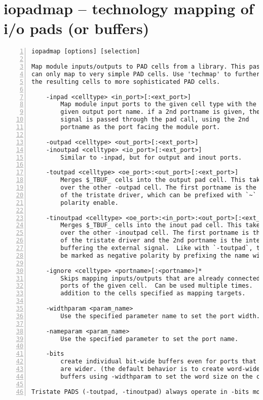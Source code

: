 \section{iopadmap -- technology mapping of i/o pads (or buffers)}
\label{cmd:iopadmap}
\begin{lstlisting}[numbers=left,frame=single]
    iopadmap [options] [selection]

Map module inputs/outputs to PAD cells from a library. This pass
can only map to very simple PAD cells. Use 'techmap' to further map
the resulting cells to more sophisticated PAD cells.

    -inpad <celltype> <in_port>[:<ext_port>]
        Map module input ports to the given cell type with the
        given output port name. if a 2nd portname is given, the
        signal is passed through the pad call, using the 2nd
        portname as the port facing the module port.

    -outpad <celltype> <out_port>[:<ext_port>]
    -inoutpad <celltype> <io_port>[:<ext_port>]
        Similar to -inpad, but for output and inout ports.

    -toutpad <celltype> <oe_port>:<out_port>[:<ext_port>]
        Merges $_TBUF_ cells into the output pad cell. This takes precedence
        over the other -outpad cell. The first portname is the enable input
        of the tristate driver, which can be prefixed with `~` for negative
        polarity enable.

    -tinoutpad <celltype> <oe_port>:<in_port>:<out_port>[:<ext_port>]
        Merges $_TBUF_ cells into the inout pad cell. This takes precedence
        over the other -inoutpad cell. The first portname is the enable input
        of the tristate driver and the 2nd portname is the internal output
        buffering the external signal.  Like with `-toutpad`, the enable can
        be marked as negative polarity by prefixing the name with `~`.

    -ignore <celltype> <portname>[:<portname>]*
        Skips mapping inputs/outputs that are already connected to given
        ports of the given cell.  Can be used multiple times.  This is in
        addition to the cells specified as mapping targets.

    -widthparam <param_name>
        Use the specified parameter name to set the port width.

    -nameparam <param_name>
        Use the specified parameter to set the port name.

    -bits
        create individual bit-wide buffers even for ports that
        are wider. (the default behavior is to create word-wide
        buffers using -widthparam to set the word size on the cell.)

Tristate PADS (-toutpad, -tinoutpad) always operate in -bits mode.
\end{lstlisting}

